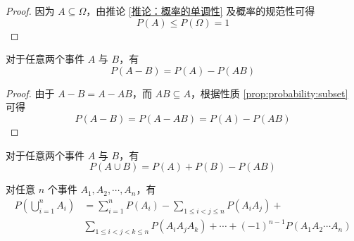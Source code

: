 \begin{proof}
    因为 $A \subseteq \varOmega$，由推论 \ref{推论：概率的单调性} 及概率的规范性可得
    \[
    P(A) \leqslant P(\varOmega) = 1
    \]
\end{proof}

\begin{property}
    \indent 对于任意两个事件 $A$ 与 $B$，有
    \begin{equation}
        P(A-B)=P(A)-P(AB)
    \end{equation}
\end{property}

\begin{proof}
    由于 $A-B=A-AB$，而 $AB \subseteq A$，根据性质 \ref{prop:probability:subset} 可得
    \[
    P(A-B)=P(A-AB)=P(A)-P(AB)
    \]
\end{proof}

\begin{property}
    \indent 对于任意两个事件 $A$ 与 $B$，有
    \begin{equation} \label{equation:add}
        P(A \cup B) = P(A) + P(B) - P(AB)
    \end{equation}

    对任意 $n$ 个事件 $A_1,A_2,\cdots,A_n$，有
    \begin{equation} \label{equation:normal add}
        \begin{aligned}
            P \left( \bigcup_{i=1}^n A_i \right) &= \sum_{i=1}^n P(A_i) - \sum_{1 \leqslant i<j \leqslant n} P(A_i A_j) + \\
            & \sum_{1 \leqslant i<j<k \leqslant n} P(A_i A_j A_k) + \cdots + (-1)^{n-1} P(A_1 A_2 \cdots A_n)
        \end{aligned}
    \end{equation}
\end{property}

